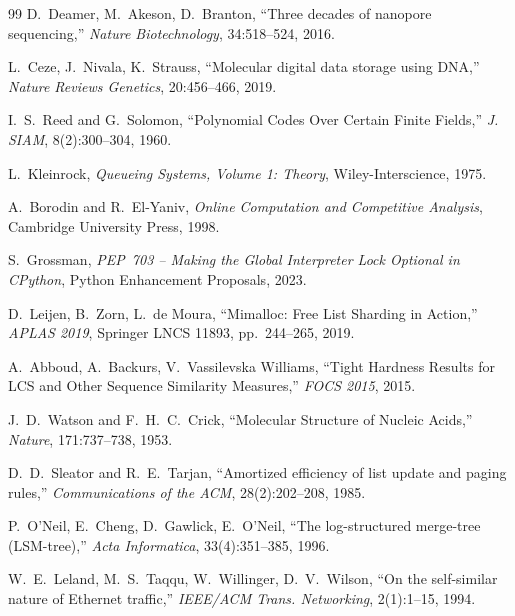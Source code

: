 ﻿\documentclass[a4paper,12pt]{article}
\theoremstyle{definition}
\begin{document}
\begin{thebibliography}{99}
  D.~Deamer, M.~Akeson, D.~Branton,
  ``Three decades of nanopore sequencing,''
  \textit{Nature Biotechnology}, 34:518--524, 2016.

  L.~Ceze, J.~Nivala, K.~Strauss,
  ``Molecular digital data storage using DNA,''
  \textit{Nature Reviews Genetics}, 20:456--466, 2019.

  I.~S.~Reed and G.~Solomon,
  ``Polynomial Codes Over Certain Finite Fields,''
  \textit{J. SIAM}, 8(2):300--304, 1960.

  L.~Kleinrock,
  \textit{Queueing Systems, Volume 1: Theory},
  Wiley-Interscience, 1975.

  A.~Borodin and R.~El-Yaniv,
  \textit{Online Computation and Competitive Analysis},
  Cambridge University Press, 1998.

  S.~Grossman,
  \textit{PEP~703 -- Making the Global Interpreter Lock Optional in CPython},
  Python Enhancement Proposals, 2023.

  D.~Leijen, B.~Zorn, L.~de Moura,
  ``Mimalloc: Free List Sharding in Action,''
  \textit{APLAS 2019}, Springer LNCS 11893, pp.~244--265, 2019.

  A.~Abboud, A.~Backurs, V.~Vassilevska Williams,
  ``Tight Hardness Results for LCS and Other Sequence Similarity Measures,''
  \textit{FOCS 2015}, 2015.

  J.~D.~Watson and F.~H.~C.~Crick,
  ``Molecular Structure of Nucleic Acids,''
  \textit{Nature}, 171:737--738, 1953.

  D.~D.~Sleator and R.~E.~Tarjan,
  ``Amortized efficiency of list update and paging rules,''
  \textit{Communications of the ACM}, 28(2):202--208, 1985.

  P.~O'Neil, E.~Cheng, D.~Gawlick, E.~O'Neil,
  ``The log-structured merge-tree (LSM-tree),''
  \textit{Acta Informatica}, 33(4):351--385, 1996.

  W.~E.~Leland, M.~S.~Taqqu, W.~Willinger, D.~V.~Wilson,
  ``On the self-similar nature of Ethernet traffic,''
  \textit{IEEE/ACM Trans. Networking}, 2(1):1--15, 1994.

\end{thebibliography}
\end{document}
